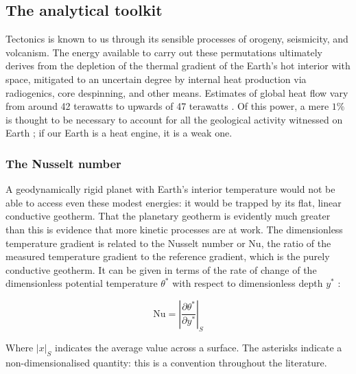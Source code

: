\documentclass[a4paper,11pt,oneside]{book}
\begin{document}
\subsection{The analytical toolkit}

Tectonics is known to us through its sensible processes of orogeny, seismicity, and volcanism. The energy available to carry out these permutations ultimately derives from the depletion of the thermal gradient of the Earth's hot interior with space, mitigated to an uncertain degree by internal heat production via radiogenics, core despinning, and other means. Estimates of global heat flow vary from around 42 terawatts \cite{Dye2012-cx} to upwards of 47 terawatts \cite{Davies2010-gz}. Of this power, a mere $1\%$ is thought to be necessary to account for all the geological activity witnessed on Earth \cite{Turcotte2014-by}; if our Earth is a heat engine, it is a weak one.

\subsubsection{The Nusselt number}

A geodynamically rigid planet with Earth's interior temperature would not be able to access even these modest energies: it would be trapped by its flat, linear conductive geotherm. That the planetary geotherm is evidently much greater than this is evidence that more kinetic processes are at work. The dimensionless temperature gradient is related to the Nusselt number or $\mathrm{Nu}$, the ratio of the measured temperature gradient to the reference gradient, which is the purely conductive geotherm. It can be given in terms of the rate of change of the dimensionless potential temperature $\theta^*$ with respect to dimensionless depth $y^*$ \cite{Schubert2001-ea}:

\begin{equation}
\mathrm{Nu} = \left| \frac{\partial \theta^*}{\partial y^*} \right| _S
\end{equation}

Where $|x|_S$ indicates the average value across a surface. The asterisks indicate a non-dimensionalised quantity: this is a convention throughout the literature.
\end{document}
